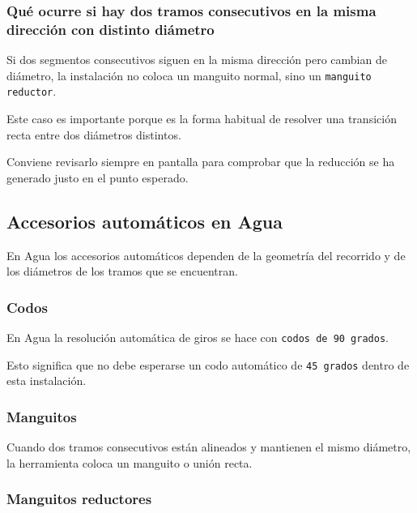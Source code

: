 
\subsubsection{Qué ocurre si hay dos tramos consecutivos en la misma dirección con distinto diámetro}

Si dos segmentos consecutivos siguen en la misma dirección pero cambian de diámetro, la instalación no coloca un manguito normal, sino un \texttt{manguito reductor}.

Este caso es importante porque es la forma habitual de resolver una transición recta entre dos diámetros distintos.

Conviene revisarlo siempre en pantalla para comprobar que la reducción se ha generado justo en el punto esperado.


\subsection{Accesorios automáticos en Agua}

En Agua los accesorios automáticos dependen de la geometría del recorrido y de los diámetros de los tramos que se encuentran.

\subsubsection{Codos}

En Agua la resolución automática de giros se hace con \texttt{codos de 90 grados}.

Esto significa que no debe esperarse un codo automático de \texttt{45 grados} dentro de esta instalación.


\subsubsection{Manguitos}

Cuando dos tramos consecutivos están alineados y mantienen el mismo diámetro, la herramienta coloca un manguito o unión recta.

\subsubsection{Manguitos reductores}

